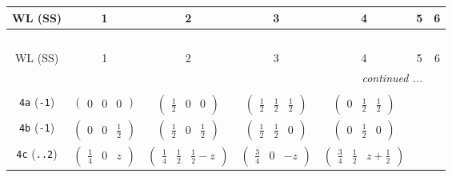 \documentclass[fleqn,9pt,landscape]{jsarticle}
\begin{document}
\begin{center}
\renewcommand{\arraystretch}{1.2}
\begin{longtable}{ccccccc}
 \hline \hline
WL (SS) & 1 & 2 & 3 & 4 & 5 & 6 \\ \hline \endfirsthead

\multicolumn{6}{l}{\tablename\ \thetable{}} \\
 \hline \hline
WL (SS) & 1 & 2 & 3 & 4 & 5 & 6 \\ \hline \endhead

 \hline \hline
\multicolumn{6}{r}{\footnotesize\it continued ...} \\ \endfoot

 \hline \hline
\multicolumn{6}{r}{} \\ \endlastfoot

{\tt 4a} ({\tt -1}) & $ \begin{pmatrix} 0 & 0 & 0 \end{pmatrix} $ & $ \begin{pmatrix} \frac{1}{2} & 0 & 0 \end{pmatrix} $ & $ \begin{pmatrix} \frac{1}{2} & \frac{1}{2} & \frac{1}{2} \end{pmatrix} $ & $ \begin{pmatrix} 0 & \frac{1}{2} & \frac{1}{2} \end{pmatrix} $ & $  $ & $  $ \\ \hline
{\tt 4b} ({\tt -1}) & $ \begin{pmatrix} 0 & 0 & \frac{1}{2} \end{pmatrix} $ & $ \begin{pmatrix} \frac{1}{2} & 0 & \frac{1}{2} \end{pmatrix} $ & $ \begin{pmatrix} \frac{1}{2} & \frac{1}{2} & 0 \end{pmatrix} $ & $ \begin{pmatrix} 0 & \frac{1}{2} & 0 \end{pmatrix} $ & $  $ & $  $ \\ \hline
{\tt 4c} ({\tt ..2}) & $ \begin{pmatrix} \frac{1}{4} & 0 & z \end{pmatrix} $ & $ \begin{pmatrix} \frac{1}{4} & \frac{1}{2} & \frac{1}{2} - z \end{pmatrix} $ & $ \begin{pmatrix} \frac{3}{4} & 0 & - z \end{pmatrix} $ & $ \begin{pmatrix} \frac{3}{4} & \frac{1}{2} & z + \frac{1}{2} \end{pmatrix} $ & $  $ & $  $ \\ \hline

\end{longtable}
\end{center}
\end{document}
